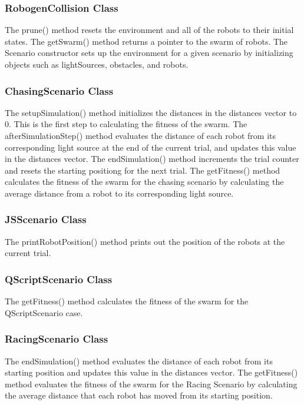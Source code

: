 \documentclass[11pt,a4paper]{article}
\begin{document}
\subsubsection{RobogenCollision Class}

The prune() method resets the environment and all of the robots to their
initial states.  The getSwarm() method returns a pointer to the swarm of
robots.  The Scenario constructor sets up the environment for a given scenario
by initializing objects such as lightSources, obstacles, and robots.

\subsubsection{ChasingScenario Class}

The setupSimulation() method initializes the distances in the distances vector
to 0.  This is the first step to calculating the fitness of the swarm.  The
afterSimulationStep() method evaluates the distance of each robot from its
corresponding light source at the end of the current trial, and updates this
value in the distances vector.  The endSimulation() method increments the trial
counter and resets the starting positiong for the next trial.  The getFitness()
method calculates the fitness of the swarm for the chasing scenario by
calculating the average distance from a robot to its corresponding light
source.

\subsubsection{JSScenario Class}
The printRobotPosition() method prints out the position of the robots at the
current trial.

\subsubsection{QScriptScenario Class}
The getFitness() method calculates the fitness of the swarm for the
QScriptScenario case.

\subsubsection{RacingScenario Class}
The endSimulation() method evaluates the distance of each robot from its
starting position and updates this value in the distances vector.  The
getFitness() method evaluates the fitness of the swarm for the Racing Scenario
by calculating the average distance that each robot has moved from its starting
position.
\end{document}
